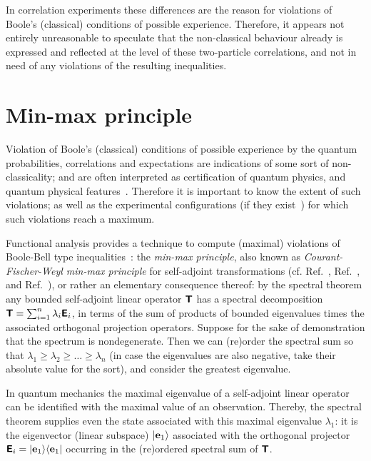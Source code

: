 \documentclass[%
  twocolumn,
 showpacs,
 showkeys,
 preprintnumbers,
 amsmath,amssymb,
 aps,
  pra,
  longbibliography,
 floatfix,
 ]{revtex4-1}
\begin{document}
In correlation experiments these differences are the reason for violations of Boole's
(classical) conditions of possible experience.
Therefore, it appears not entirely unreasonable to speculate that
the non-classical behaviour already is expressed and reflected at the level of these two-particle correlations,
and not in need of any violations of the resulting inequalities.


\section{Min-max principle}

Violation of  Boole's
(classical) conditions of possible experience
by the quantum probabilities, correlations  and expectations
are indications of some sort of non-classicality;
and are often interpreted as certification of
quantum physics, and quantum physical features~\cite{belrand2010,Um-2013}.
Therefore it is important to know the extent of such violations; as well as the experimental configurations
(if they exist~\cite{specker57})
for which such violations reach a maximum.

Functional analysis provides a technique to compute (maximal) violations of Boole-Bell type inequalities~\cite{filipp-svo-04-qpoly,filipp-svo-05}:
the
{\em min-max principle},
also known as
{\em Courant-Fischer-Weyl min-max principle} for self-adjoint transformations
(cf. Ref.~\cite[\S~90]{halmos-vs},  Ref.~\cite[pp.~75ff]{reed-sim4},
and  Ref.~\cite[Sect.~4.4, pp.~142ff]{Teschl-schr}),
or rather an elementary consequence thereof:
by the spectral theorem any bounded self-adjoint linear operator $\textsf{\textbf{T}}$ has a spectral decomposition
$\textsf{\textbf{T}}=\sum_{i=1}^{n} \lambda_i \textsf{\textbf{E}}_i$, in terms of the sum of products
of bounded eigenvalues times the associated orthogonal projection operators.
Suppose for the sake of demonstration that the spectrum is nondegenerate.
Then we can (re)order the spectral sum so that $\lambda_1 \ge \lambda_2 \ge \ldots \ge \lambda_n$
(in case the eigenvalues are also negative, take their absolute value for the sort),
and consider  the greatest eigenvalue.%

In quantum mechanics  the maximal eigenvalue of a self-adjoint linear operator can be identified
with the maximal value of an observation.
Thereby, the spectral theorem supplies even the state associated with this maximal eigenvalue $\lambda_1$: it is the
eigenvector (linear subspace)  $\vert {\bf e}_1 \rangle $ associated with the orthogonal projector
 $\textsf{\textbf{E}}_i = \vert {\bf e}_1 \rangle \langle  {\bf e}_1 \vert $ occurring in the (re)ordered
spectral sum  of $\textsf{\textbf{T}}$.
\end{document}
